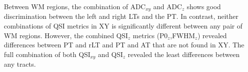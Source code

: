 Between WM regions, the combination of ADC$_{xy}$ and ADC$_{z}$ shows good discrimination between the left and right LTs and the PT. In contrast, neither combinations of QSI metrics in XY is significantly different between any pair of WM regions. However, the combined QSI$_z$ metrics (P0$_z$,FWHM$_z$) revealed differences between PT and rLT and PT and AT that are not found in XY. The full combination of both QSI$_{xy}$ and QSI$_{z}$ revealed the least differences between any tracts.
\begin{table}[p]
\begin{captionframe}
    \caption[Pair-wise t-test results between SC tracts in ADC and QSI parameters.]{Pair-wise t-test results between SC tracts in ADC and QSI parameters. Statistically different values are marked \textbf{bold} for p<0.05, \textbf{\textit{bold-italic}} for p<0.01.}
    \label{tab:chapter6 single ttest}%
\end{captionframe}
\begin{tableframe}
\footnotesize
\centering
\end{tableframe}
\end{table}
